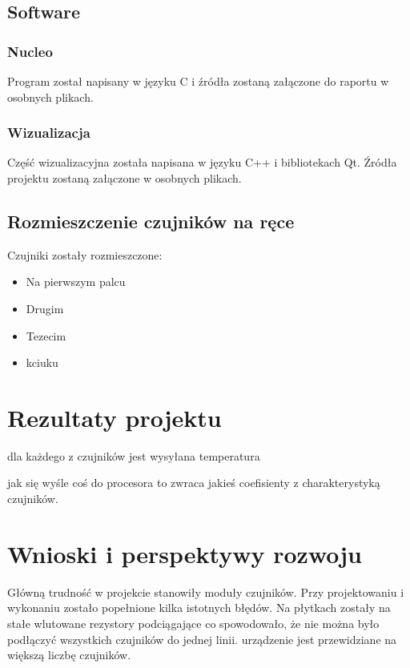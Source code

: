 \documentclass[a4paper,12pt]{article}
\begin{document}
		\subsection{Software}
			\subsubsection{Nucleo}
				Program został napisany w języku C i źródła zostaną załączone do raportu w osobnych plikach.
			\subsubsection{Wizualizacja}
				Część wizualizacyjna została napisana w języku C++ i bibliotekach Qt. Źródła projektu zostaną załączone w osobnych plikach.
		\subsection{Rozmieszczenie czujników na ręce}
		Czujniki zostały rozmieszczone:
		\begin{itemize}
			\item Na pierwszym palcu
			\item Drugim
			\item Tezecim
			\item kciuku
		\end{itemize}
		

	\section{Rezultaty projektu}	
	
	dla każdego z czujników jest wysyłana temperatura
	
	jak się wyśle coś do procesora to zwraca jakieś coefisienty z charakterystyką czujników.	
			
	\section{Wnioski i perspektywy rozwoju}
		Główną trudność w projekcie stanowiły moduły czujników. Przy projektowaniu i wykonaniu zostało popełnione kilka istotnych błędów. Na płytkach zostały na stałe wlutowane rezystory podciągające co spowodowało, że nie można było podłączyć wszystkich czujników do jednej linii.
	urządzenie jest przewidziane na większą liczbę czujników.
	
\end{document}

